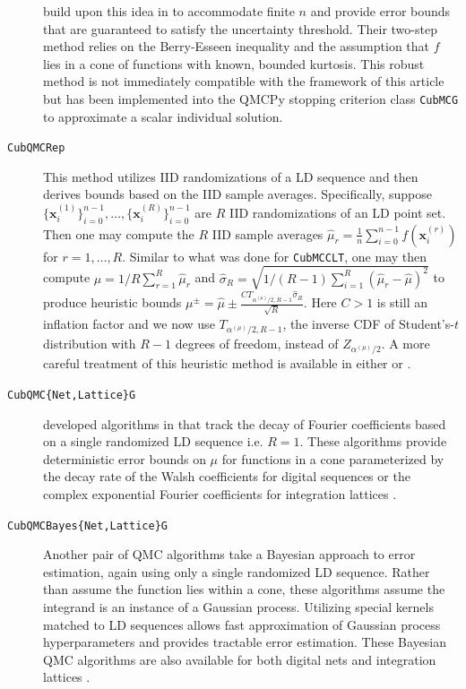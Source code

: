\documentclass[graybox]{svmult}
\begin{document}
\begin{description}
    \citeauthor{cubmcg} build upon this idea in \cite{cubmcg} to accommodate  finite $n$ and provide error bounds that are guaranteed to satisfy the uncertainty threshold. Their two-step method relies on the Berry-Esseen inequality and the assumption that $f$ lies in a cone of functions with known, bounded kurtosis. This robust method is not immediately compatible with the framework of this article but has been implemented into the QMCPy stopping criterion class \texttt{CubMCG} to approximate a scalar individual solution.
    \item[\texttt{CubQMCRep}] This method utilizes IID randomizations of a LD sequence and then derives bounds based on the IID sample averages. Specifically, suppose $\{\boldsymbol{x}_i^{(1)}\}_{i=0}^{n-1},\dots,\{\boldsymbol{x}_i^{(R)}\}_{i=0}^{n-1}$ are $R$ IID randomizations of an LD point set. Then one may compute the $R$ IID sample averages $\hat{\mu}_r = \frac{1}{n} \sum_{i=0}^{n-1} f(\boldsymbol{x}_i^{(r)})$ for $r = 1,\dots,R$. Similar to what was done for \texttt{CubMCCLT}, one may then compute $\hat{\mu} = 1/R \sum_{r=1}^R \hat{\mu}_r$ and $\hat{\sigma}_R = \sqrt{1/(R-1)\sum_{i=1}^R(\hat{\mu}_r - \hat{\mu})^2}$ to produce heuristic bounds $\mu^\pm = \hat{\mu} \pm \frac{C T_{\alpha^{(\mu)}/2,R-1} \hat{\sigma}_R}{\sqrt{R}}$. Here $C>1$ is still an inflation factor and we now use $T_{\alpha^{(\mu)}/2,R-1}$, the inverse CDF of Student's-$t$ distribution with $R-1$ degrees of freedom, instead of $Z_{\alpha^{(\mu)}/2}$.
    A more careful treatment of this heuristic method is available in either \cite[Chapter 17]{mcbook} or \cite{qmc4pde_preprint}. 
    \item[\texttt{CubQMC\{Net,Lattice\}G}] \citeauthor{cubqmclattice} developed algorithms in \cite{adaptive_qmc} that track the decay of Fourier coefficients based on a single randomized LD sequence i.e. $R=1$. These algorithms provide deterministic error bounds on $\mu$ for functions in a cone parameterized by the decay rate of the Walsh coefficients for digital sequences \cite{cubqmcsobol} or the complex exponential Fourier coefficients for integration lattices \cite{cubqmclattice}. 
    \item[\texttt{CubQMCBayes\{Net,Lattice\}G}] Another pair of QMC algorithms take a Bayesian approach to error estimation, again using only a single randomized LD sequence. Rather than assume the function lies within a cone, these algorithms assume the integrand is an instance of a Gaussian process. Utilizing special kernels matched to LD sequences allows fast approximation of Gaussian process hyperparameters and provides tractable error estimation. These Bayesian QMC algorithms are also available for both digital nets \cite{cubqmcbayes_thesis} and integration lattices  \cite{cubqmcbayeslattice}. 
\end{description}
\end{document}
